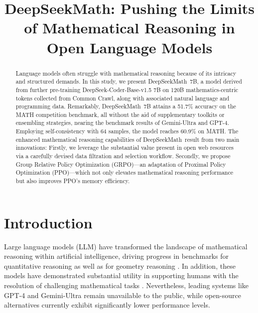 \title{DeepSeekMath: Pushing the Limits of Mathematical Reasoning in Open Language Models}

\begin{abstract}
Language models often struggle with mathematical reasoning because of its intricacy and structured demands. In this study, we present DeepSeekMath~7B, a model derived from further pre-training DeepSeek-Coder-Base-v1.5 7B on 120B mathematics-centric tokens collected from Common Crawl, along with associated natural language and programming data. Remarkably, DeepSeekMath~7B attains a 51.7\% accuracy on the MATH competition benchmark, all without the aid of supplementary toolkits or ensembling strategies, nearing the benchmark results of Gemini-Ultra and GPT-4. Employing self-consistency with 64 samples, the model reaches 60.9\% on MATH. The enhanced mathematical reasoning capabilities of DeepSeekMath~result from two main innovations: Firstly, we leverage the substantial value present in open web resources via a carefully devised data filtration and selection workflow. Secondly, we propose Group Relative Policy Optimization (GRPO)—an adaptation of Proximal Policy Optimization (PPO)—which not only elevates mathematical reasoning performance but also improves PPO’s memory efficiency.
\end{abstract}

\section{Introduction}

Large language models (LLM) have transformed the landscape of mathematical reasoning within artificial intelligence, driving progress in benchmarks for quantitative reasoning \citep{MATH} as well as for geometry reasoning \citep{trinh2024solving}. In addition, these models have demonstrated substantial utility in supporting humans with the resolution of challenging mathematical tasks \citep{tao}. Nevertheless, leading systems like GPT-4 \citep{gpt4} and Gemini-Ultra \citep{gemini} remain unavailable to the public, while open-source alternatives currently exhibit significantly lower performance levels.

